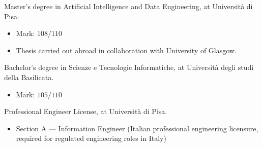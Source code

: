 
\begin{scholarship}
				{Master's degree in Artificial Intelligence and Data Engineering, at Università di Pisa.
				\begin{itemize}
				    \item Mark: $108/110$
				    \item Thesis carried out abroad in collaboration with University of Glasgow.
				\end{itemize}
			}
	
				{Bachelor's degree in Scienze e Tecnologie Informatiche, at Università degli studi della Basilicata.
				\begin{itemize}
				    \item Mark: $105/110$
				\end{itemize}
			}
	
				{Professional Engineer License, at Università di Pisa.
				\begin{itemize}
				    \item Section A — Information Engineer (Italian professional engineering licensure, required for regulated engineering roles in Italy)
				\end{itemize}
			}

\end{scholarship}
